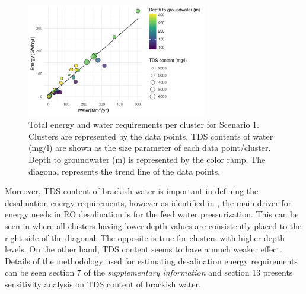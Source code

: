 \begin{figure}[!b]
	\centering
	\includegraphics[width=0.7\textwidth]{Images/NexusPlotWithReuse.pdf}
	\caption{Total energy and water requirements per cluster for Scenario 1. Clusters are represented by the data points. TDS contents of water (mg/l) are shown as the size parameter of each data point/cluster. Depth to groundwater (m) is represented by the color ramp. The diagonal represents the trend line of the data points.}
	\label{fig:energyclusters}
\end{figure}

 Moreover, TDS content of brackish water is important in defining the desalination energy requirements, however as identified in \cite{karabelasAnalysisSpecificEnergy2018a,panBrackishWaterDesalination2020}, the main driver for energy needs in RO desalination is for the feed water pressurization. This can be seen in  where all clusters having lower depth values are consistently placed to the right side of the diagonal. The opposite is true for clusters with higher depth levels. On the other hand, TDS content seems to have a much weaker effect. Details of the methodology used for estimating desalination energy requirements can be seen section 7 of the \textit{supplementary information}  and section 13 presents sensitivity analysis on TDS content of brackish water. 


